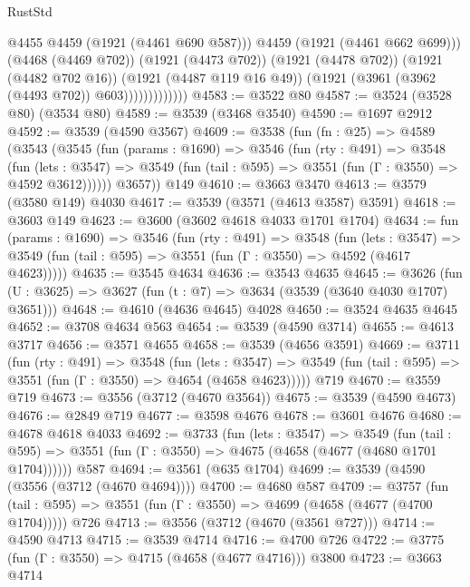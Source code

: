 \begin{lexlean}{RustStd}
\begin{coremodule}
                              @4455
                              @4459
                              (@1921 (@4461 @690 @587)))
                            @4459
                            (@1921 (@4461 @662 @699)))
                          (@4468 (@4469 @702))
                          (@1921 (@4473 @702))
                          (@1921 (@4478 @702))
                          (@1921 (@4482 @702 @16))
                          (@1921 (@4487 @119 @16 @49))
                          (@1921 (@3961 (@3962 (@4493 @702)) @603)))))))))))))
@4583 := @3522 @80
@4587 := @3524 (@3528 @80) (@3534 @80)
@4589 := @3539 (@3468 @3540)
@4590 := @1697 @2912
@4592 := @3539 (@4590 @3567)
@4609 := @3538
    (fun (fn : @25) =>
    @4589
      (@3543
        (@3545
          (fun (params : @1690) =>
          @3546
            (fun (rty : @491) =>
            @3548
              (fun (lets : @3547) =>
              @3549 (fun (tail : @595) => @3551 (fun (Γ : @3550) => @4592 @3612))))))
        @3657))
    @149
@4610 := @3663 @3470
@4613 := @3579 (@3580 @149) @4030
@4617 := @3539 (@3571 (@4613 @3587) @3591)
@4618 := @3603 @149
@4623 := @3600 (@3602 @4618 @4033 @1701 @1704)
@4634 := fun (params : @1690) =>
  @3546
    (fun (rty : @491) =>
    @3548
      (fun (lets : @3547) =>
      @3549 (fun (tail : @595) => @3551 (fun (Γ : @3550) => @4592 (@4617 @4623)))))
@4635 := @3545 @4634
@4636 := @3543 @4635
@4645 := @3626 (fun (U : @3625) => @3627 (fun (t : @7) => @3634 (@3539 (@3640 @4030 @1707) @3651)))
@4648 := @4610 (@4636 @4645) @4028
@4650 := @3524 @4635 @4645
@4652 := @3708 @4634 @563
@4654 := @3539 (@4590 @3714)
@4655 := @4613 @3717
@4656 := @3571 @4655
@4658 := @3539 (@4656 @3591)
@4669 := @3711
    (fun (rty : @491) =>
    @3548
      (fun (lets : @3547) =>
      @3549 (fun (tail : @595) => @3551 (fun (Γ : @3550) => @4654 (@4658 @4623)))))
    @719
@4670 := @3559 @719
@4673 := @3556 (@3712 (@4670 @3564))
@4675 := @3539 (@4590 @4673)
@4676 := @2849 @719
@4677 := @3598 @4676
@4678 := @3601 @4676
@4680 := @4678 @4618 @4033
@4692 := @3733
    (fun (lets : @3547) =>
    @3549
      (fun (tail : @595) => @3551 (fun (Γ : @3550) => @4675 (@4658 (@4677 (@4680 @1701 @1704))))))
    @587
@4694 := @3561 (@635 @1704)
@4699 := @3539 (@4590 (@3556 (@3712 (@4670 @4694))))
@4700 := @4680 @587
@4709 := @3757
    (fun (tail : @595) => @3551 (fun (Γ : @3550) => @4699 (@4658 (@4677 (@4700 @1704)))))
    @726
@4713 := @3556 (@3712 (@4670 (@3561 @727)))
@4714 := @4590 @4713
@4715 := @3539 @4714
@4716 := @4700 @726
@4722 := @3775 (fun (Γ : @3550) => @4715 (@4658 (@4677 @4716))) @3800
@4723 := @3663 @4714

\end{coremodule}
\end{lexlean}
